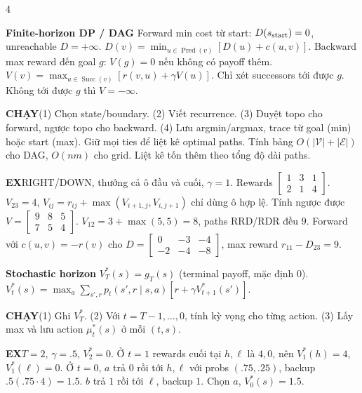 \documentclass[a4paper]{article}
\newcommand{\run}[1]{\key{CHẠY}#1}
\newcommand{\key}[1]{\par\textcolor{structure}{\textbf{#1}}\enspace}
\newcommand{\note}[4]{\par\begingroup\setlength{\fboxsep}{0.15pt}%
  \noindent\colorbox{#1}{\parbox{\dimexpr\linewidth-2\fboxsep\relax}{%
    \RaggedRight\textcolor{#2}{\textbf{#3}}\enspace #4}}%
  \endgroup\par}
\newcommand{\ex}[1]{\note{examplebg}{example}{EX}{#1}}
\begin{document}
\begin{multicols*}{4}
\key{Finite-horizon DP / DAG}
Forward min cost từ start: $D(s_{\rm start})=0$, unreachable $D=+\infty$.
$D(v)=\min_{u\in\operatorname{Pred}(v)}[D(u)+c(u,v)]$.
Backward max reward đến goal $g$: $V(g)=0$ nếu không có payoff thêm.
$V(v)=\max_{u\in\operatorname{Succ}(v)}[r(v,u)+\gamma V(u)]$.
Chỉ xét successors tới được $g$. Không tới được $g$ thì $V=-\infty$.
\run{(1) Chọn state/boundary. (2) Viết recurrence. (3) Duyệt topo cho forward, ngược topo cho backward. (4) Lưu argmin/argmax, trace từ goal (min) hoặc start (max). Giữ mọi ties để liệt kê optimal paths. Tính bảng $O(|\mathcal V|+|\mathcal E|)$ cho DAG, $O(nm)$ cho grid. Liệt kê tốn thêm theo tổng độ dài paths.}
\ex{RIGHT/DOWN, thưởng cả ô đầu và cuối, $\gamma=1$. Rewards $\left[\begin{smallmatrix}1&3&1\\2&1&4\end{smallmatrix}\right]$. $V_{23}=4$, $V_{ij}=r_{ij}+\max(V_{i+1,j},V_{i,j+1})$ chỉ dùng ô hợp lệ. Tính ngược được $V=\left[\begin{smallmatrix}9&8&5\\7&5&4\end{smallmatrix}\right]$. $V_{12}=3+\max(5,5)=8$, paths RRD/RDR đều $9$. Forward với $c(u,v)=-r(v)$ cho $D=\left[\begin{smallmatrix}0&-3&-4\\-2&-4&-8\end{smallmatrix}\right]$, max reward $r_{11}-D_{23}=9$.}
\key{Stochastic horizon}
$V_T^*(s)=g_T(s)$ (terminal payoff, mặc định $0$).
$V_t^*(s)=\max_a\sum_{s',r}p_t(s',r\mid s,a)[r+\gamma V_{t+1}^*(s')]$.
\run{(1) Ghi $V_T^*$. (2) Với $t=T-1,\ldots,0$, tính kỳ vọng cho từng action. (3) Lấy max và lưu action $\mu_t^*(s)$ ở mỗi $(t,s)$.}
\ex{$T=2$, $\gamma=.5$, $V_2^*=0$. Ở $t=1$ rewards cuối tại $h,\ell$ là $4,0$, nên $V_1^*(h)=4$, $V_1^*(\ell)=0$. Ở $t=0$, $a$ trả $0$ rồi tới $h,\ell$ với probs $(.75,.25)$, backup $.5(.75\cdot4)=1.5$. $b$ trả $1$ rồi tới $\ell$, backup $1$. Chọn $a$, $V_0^*(s)=1.5$.}


\end{multicols*}
\end{document}
